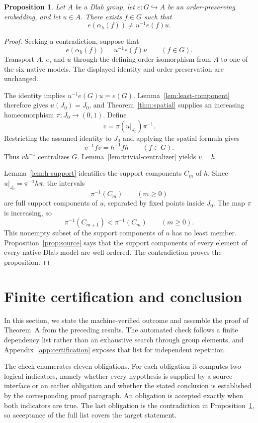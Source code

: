 \documentclass[11pt]{amsart}
\newtheorem{proposition}[theorem]{Proposition}
\theoremstyle{definition}
\theoremstyle{remark}
\numberwithin{equation}{section}
\begin{document}
\begin{proposition}
\label{prop:ambient-exclusion}
Let \(A\) be a Dlab group, let \(e:G\hookrightarrow A\) be an order-preserving embedding, and let \(u\in A\). There exists \(f\in G\) such that
\[
e(\alpha_h(f))\ne u^{-1}e(f)u.
\]
\end{proposition}

\begin{proof}
Seeking a contradiction, suppose that
\[
e(\alpha_h(f))=u^{-1}e(f)u
\qquad(f\in G).
\]
Transport \(A\), \(e\), and \(u\) through the defining order isomorphism from \(A\) to one of the six native models. The displayed identity and order preservation are unchanged.

The identity implies \(u^{-1}e(G)u=e(G)\). Lemma~\ref{lem:least-component} therefore gives \(u(J_0)=J_0\), and Theorem~\ref{thm:spatial} supplies an increasing homeomorphism \(\pi:J_0\to(0,1)\). Define
\[
v=\pi(u|_{J_0})\pi^{-1}.
\]
Restricting the assumed identity to \(J_0\) and applying the spatial formula gives
\[
v^{-1}fv=h^{-1}fh
\qquad(f\in G).
\]
Thus \(vh^{-1}\) centralizes \(G\). Lemma~\ref{lem:trivial-centralizer} yields \(v=h\).

Lemma~\ref{lem:h-support} identifies the support components \(C_m\) of \(h\). Since \(u|_{J_0}=\pi^{-1}h\pi\), the intervals
\[
\pi^{-1}(C_m)
\qquad(m\geq0)
\]
are full support components of \(u\), separated by fixed points inside \(J_0\). The map \(\pi\) is increasing, so
\[
\pi^{-1}(C_{m+1})<\pi^{-1}(C_m)
\qquad(m\geq0).
\]
This nonempty subset of the support components of \(u\) has no least member. Proposition~\ref{prop:source} says that the support components of every element of every native Dlab model are well ordered. The contradiction proves the proposition.
\end{proof}

\section{Finite certification and conclusion}
\label{sec:certification}

In this section, we state the machine-verified outcome and assemble the proof of Theorem~A from the preceding results. The automated check follows a finite dependency list rather than an exhaustive search through group elements, and Appendix~\ref{app:certification} exposes that list for independent repetition.

The check enumerates eleven obligations. For each obligation it computes two logical indicators, namely whether every hypothesis is supplied by a source interface or an earlier obligation and whether the stated conclusion is established by the corresponding proof paragraph. An obligation is accepted exactly when both indicators are true. The last obligation is the contradiction in Proposition~\ref{prop:ambient-exclusion}, so acceptance of the full list covers the target statement.
\end{document}
